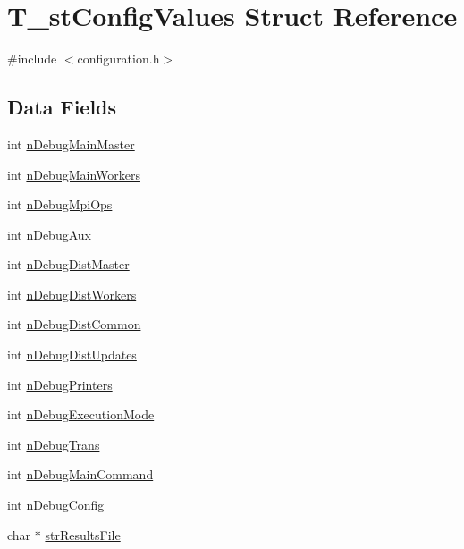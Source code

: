 \hypertarget{structT__stConfigValues}{\section{T\-\_\-st\-Config\-Values Struct Reference}
\label{structT__stConfigValues}
}


{\ttfamily \#include $<$configuration.\-h$>$}

\subsection*{Data Fields}
\begin{DoxyCompactItemize}
\item 
int \hyperlink{structT__stConfigValues_a24bdee712ac9ec8ea098475833bf64c7}{n\-Debug\-Main\-Master}
\item 
int \hyperlink{structT__stConfigValues_ad0b0917ce95d25b3fefcd85bdf0d9d72}{n\-Debug\-Main\-Workers}
\item 
int \hyperlink{structT__stConfigValues_a2505593b064dfec1b1f25c0c241d53d9}{n\-Debug\-Mpi\-Ops}
\item 
int \hyperlink{structT__stConfigValues_a617bb7970be5be3996acc27fe37b736e}{n\-Debug\-Aux}
\item 
int \hyperlink{structT__stConfigValues_a09bbefde23de1f9ee642e17f030db9e5}{n\-Debug\-Dist\-Master}
\item 
int \hyperlink{structT__stConfigValues_a177845357bb706165cd4a3dc1ffdbdcc}{n\-Debug\-Dist\-Workers}
\item 
int \hyperlink{structT__stConfigValues_af872d01e2b82875a270909cd7e59dfc6}{n\-Debug\-Dist\-Common}
\item 
int \hyperlink{structT__stConfigValues_a317e5fcb75d03f261b71e58a02ba52d5}{n\-Debug\-Dist\-Updates}
\item 
int \hyperlink{structT__stConfigValues_aea4fadbdb4e6c659f119d38a806c38c2}{n\-Debug\-Printers}
\item 
int \hyperlink{structT__stConfigValues_ad00796e06901e3a43852c48a2413dc11}{n\-Debug\-Execution\-Mode}
\item 
int \hyperlink{structT__stConfigValues_acda2f735f20ed7d850b1f1a4038b778a}{n\-Debug\-Trans}
\item 
int \hyperlink{structT__stConfigValues_ad1b2105aee0a657c0e68c4db0c75b4d6}{n\-Debug\-Main\-Command}
\item 
int \hyperlink{structT__stConfigValues_ab9d02864b458c46d840f7e783ebafb95}{n\-Debug\-Config}
\item 
char $\ast$ \hyperlink{structT__stConfigValues_a1d061110525c304ae6caa537fa72c263}{str\-Results\-File}
\end{DoxyCompactItemize}


